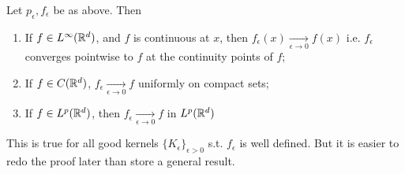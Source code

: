 \begin{thm}
    Let $p_\epsilon, f_\epsilon$ be as above. Then
    \begin{enumerate}
        \item If $f \in L^\infty(\mathbb{R}^d)$, and $f$ is continuous at $x$, then $f_\epsilon(x) \xrightarrow[\epsilon \to 0]{} f(x)$
            i.e. $f_\epsilon$ converges pointwise to $f$ at the continuity points of $f$;
            \item If $f \in C(\mathbb{R}^d)$, $f_\epsilon \xrightarrow[\epsilon \to 0]{} f$ uniformly on compact sets;
            \item If $f \in L^p(\mathbb{R}^d)$, then $f_\epsilon \xrightarrow[\epsilon \to 0]{} f$ in $L^p(\mathbb{R}^d)$      
    \end{enumerate} 
\end{thm}
\begin{rem}
    This is true for all good kernels $\{K_\epsilon\}_{\epsilon > 0}$ s.t. $f_\epsilon$ is well defined.
    But it is easier to redo the proof later than store a general result.
\end{rem}
